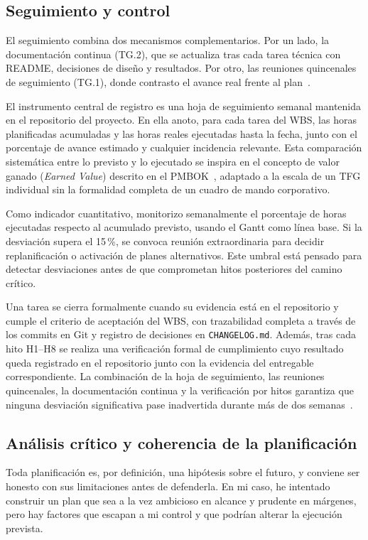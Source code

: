 \documentclass[11pt,a4paper]{article}
\begin{document}
\subsection{Seguimiento y control}

El seguimiento combina dos mecanismos complementarios. Por un lado, la documentación continua (TG.2), que se actualiza tras cada tarea técnica con README, decisiones de diseño y resultados. Por otro, las reuniones quincenales de seguimiento (TG.1), donde contrasto el avance real frente al plan~\cite{gep23}.

El instrumento central de registro es una hoja de seguimiento semanal mantenida en el repositorio del proyecto. En ella anoto, para cada tarea del WBS, las horas planificadas acumuladas y las horas reales ejecutadas hasta la fecha, junto con el porcentaje de avance estimado y cualquier incidencia relevante. Esta comparación sistemática entre lo previsto y lo ejecutado se inspira en el concepto de valor ganado (\textit{Earned Value}) descrito en el PMBOK~\cite{pmbok}, adaptado a la escala de un TFG individual sin la formalidad completa de un cuadro de mando corporativo.

Como indicador cuantitativo, monitorizo semanalmente el porcentaje de horas ejecutadas respecto al acumulado previsto, usando el Gantt como línea base. Si la desviación supera el 15\,\%, se convoca reunión extraordinaria para decidir replanificación o activación de planes alternativos. Este umbral está pensado para detectar desviaciones antes de que comprometan hitos posteriores del camino crítico.

Una tarea se cierra formalmente cuando su evidencia está en el repositorio y cumple el criterio de aceptación del WBS, con trazabilidad completa a través de los commits en Git y registro de decisiones en \texttt{CHANGELOG.md}. Además, tras cada hito H1--H8 se realiza una verificación formal de cumplimiento cuyo resultado queda registrado en el repositorio junto con la evidencia del entregable correspondiente. La combinación de la hoja de seguimiento, las reuniones quincenales, la documentación continua y la verificación por hitos garantiza que ninguna desviación significativa pase inadvertida durante más de dos semanas~\cite{gep23}.

\subsection{Análisis crítico y coherencia de la planificación}

Toda planificación es, por definición, una hipótesis sobre el futuro, y conviene ser honesto con sus limitaciones antes de defenderla. En mi caso, he intentado construir un plan que sea a la vez ambicioso en alcance y prudente en márgenes, pero hay factores que escapan a mi control y que podrían alterar la ejecución prevista.
\end{document}
